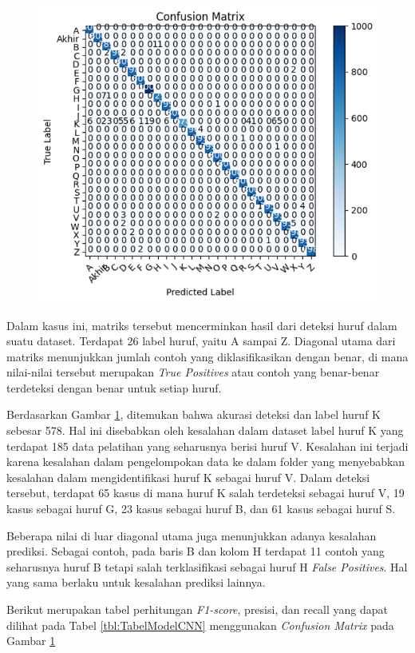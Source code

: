 \begin{figure}[!hbt]
	\centering
	\includegraphics[width=0.7\linewidth]{gambar/bener/ConfusionMatrix_ModelCNN.png}
	\label{fig:TabelModelCNN1}
\end{figure}
Dalam kasus ini, matriks tersebut mencerminkan hasil dari deteksi huruf dalam suatu dataset. Terdapat 26 label huruf, yaitu A sampai Z. Diagonal utama dari matriks menunjukkan jumlah contoh yang diklasifikasikan dengan benar, di mana nilai-nilai tersebut merupakan \textit{True Positives } atau contoh yang benar-benar terdeteksi dengan benar untuk setiap huruf.

Berdasarkan Gambar \ref{fig:TabelModelCNN1}, ditemukan bahwa akurasi deteksi dan label huruf K sebesar 578. Hal ini disebabkan oleh kesalahan dalam dataset label huruf K yang terdapat 185 data pelatihan yang seharusnya berisi huruf V. Kesalahan ini terjadi karena kesalahan dalam pengelompokan data ke dalam folder yang menyebabkan kesalahan dalam mengidentifikasi huruf K sebagai huruf V. Dalam deteksi tersebut, terdapat 65 kasus di mana huruf K salah terdeteksi sebagai huruf V, 19 kasus sebagai huruf G, 23 kasus sebagai huruf B, dan 61 kasus sebagai huruf S.

Beberapa nilai di luar diagonal utama juga menunjukkan adanya kesalahan prediksi. Sebagai contoh, pada baris B dan kolom H terdapat 11 contoh yang seharusnya huruf B tetapi salah terklasifikasi sebagai huruf H \textit{False Positives}. Hal yang sama berlaku untuk kesalahan prediksi lainnya.

Berikut merupakan tabel perhitungan \textit{F1-score}, presisi, dan recall yang dapat dilihat pada Tabel \ref{tbl:TabelModelCNN} menggunakan \textit{Confusion Matrix} pada Gambar \ref{fig:TabelModelCNN1}

